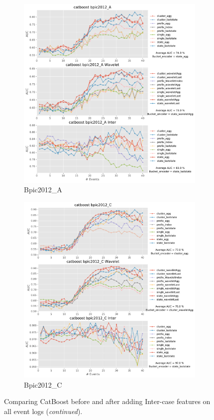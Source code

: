 \documentclass[twoside,11pt]{Latex/Classes/PhDthesisPSnPDF}
\begin{document}
\begin{figure}[!htbp]
	\medskip
	\begin{subfigure}{0.48\textwidth}
		\includegraphics[width=\linewidth]{images/inter/catboost/bpic2012_A.pdf}
		\caption{Bpic2012\_A} \label{fig:b12ai}
	\end{subfigure}\hspace*{\fill}
	\begin{subfigure}{0.48\textwidth}
		\includegraphics[width=\linewidth]{images/inter/catboost/bpic2012_C.pdf}
		\caption{Bpic2012\_C} \label{fig:b12ci}
	\end{subfigure}	
	\caption{Comparing CatBoost before and after adding Inter-case features on all event logs  (\textit{continued}).}
\label{fig:interc2}
\end{figure}
\end{document}
